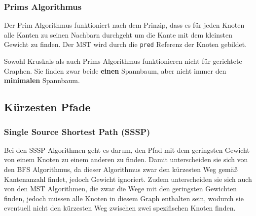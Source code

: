 \documentclass[
../AuD-Zusammenfassung.tex,
]
{subfiles}
\begin{document}
\subsubsection{Prims Algorithmus}
Der Prim Algorithmus funktioniert nach dem Prinzip, dass es für jeden Knoten alle Kanten zu seinen Nachbarn durchgeht um die Kante mit dem kleinsten Gewicht zu finden. Der MST wird durch die \texttt{pred} Referenz der Knoten gebildet.\\
\begin{algorithm}[H]
\end{algorithm}
Sowohl Kruskals als auch Prims Algorithmus funktionieren nicht für gerichtete Graphen. Sie finden zwar beide \textbf{einen} Spannbaum, aber nicht immer den \textbf{minimalen} Spannbaum.


\newpage
\subsection{Kürzesten Pfade}
\subsubsection{Single Source Shortest Path (SSSP)}
Bei den SSSP Algorithmen geht es darum, den Pfad mit dem geringsten Gewicht von einem Knoten zu einem anderen zu finden. Damit unterscheiden sie sich von den BFS Algorithmus, da dieser Algorithmus zwar den kürzesten Weg gemäß Kantenanzahl findet, jedoch Gewicht ignoriert. Zudem unterscheiden sie sich auch von den MST Algorithmen, die zwar die Wege mit den geringsten Gewichten finden, jedoch müssen alle Knoten in diesem Graph enthalten sein, wodurch sie eventuell nicht den kürzesten Weg zwischen zwei spezifischen Knoten finden.
\end{document}

